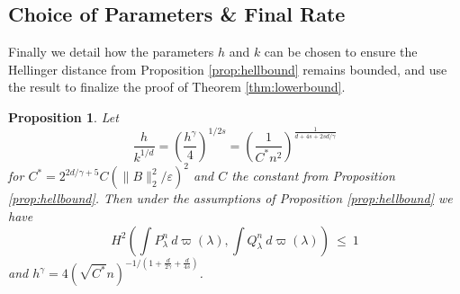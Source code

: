 \documentclass[11pt,twoside]{article}
\newtheorem{proposition}{Proposition}
\theoremstyle{definition}
\theoremstyle{remark}
\begin{document}
\bigskip

\subsection{Choice of Parameters \& Final Rate} \label{sec:finalrate}

Finally we detail how the parameters $h$ and $k$ can be chosen to ensure the Hellinger distance from Proposition \ref{prop:hellbound} remains bounded, and use the result to finalize the proof of  Theorem \ref{thm:lowerbound}. \\

\begin{proposition} \label{prop:hellbound2}
Let
$$ \frac{h}{k^{1/d}} = \left( \frac{h^\gamma}{4} \right)^{1/2s} = \left( \frac{1}{C^* n^2} \right)^{\frac{1}{d+ 4s+2sd/\gamma}} $$
for $C^* =  2^{2d/\gamma+5}  C (\|B \|_2^2/\varepsilon)^2 $ and $C$ the constant from Proposition \ref{prop:hellbound}. 
Then under the assumptions of Proposition \ref{prop:hellbound} we have
$$  H^2\left(\int P_\lambda^n \ d\varpi(\lambda), \int Q_\lambda^n \ d\varpi(\lambda) \right) \ \leq \ 1  $$ 
and
$h^\gamma =  4 (\sqrt{C^*}  n)^{-1/\left(1 + \frac{d}{2\gamma} + \frac{d}{4s} \right) }$. 
\end{proposition}

\bigskip

\end{document}
